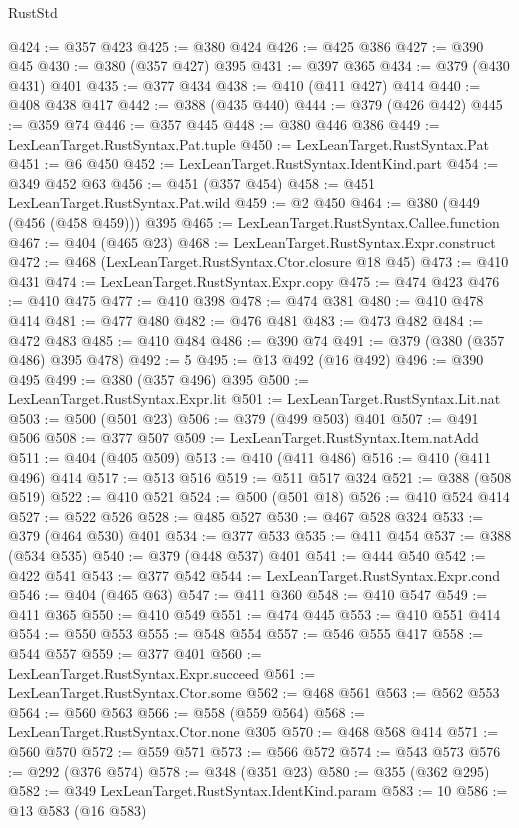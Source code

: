 \begin{lexlean}{RustStd}
\begin{coremodule}
{\begin{coremodule}
{{{{{{{{@424 := @357 @423
@425 := @380 @424
@426 := @425 @386
@427 := @390 @45
@430 := @380 (@357 @427) @395
@431 := @397 @365
@434 := @379 (@430 @431) @401
@435 := @377 @434
@438 := @410 (@411 @427) @414
@440 := @408 @438 @417
@442 := @388 (@435 @440)
@444 := @379 (@426 @442)
@445 := @359 @74
@446 := @357 @445
@448 := @380 @446 @386
@449 := LexLeanTarget.RustSyntax.Pat.tuple
@450 := LexLeanTarget.RustSyntax.Pat
@451 := @6 @450
@452 := LexLeanTarget.RustSyntax.IdentKind.part
@454 := @349 @452 @63
@456 := @451 (@357 @454)
@458 := @451 LexLeanTarget.RustSyntax.Pat.wild
@459 := @2 @450
@464 := @380 (@449 (@456 (@458 @459))) @395
@465 := LexLeanTarget.RustSyntax.Callee.function
@467 := @404 (@465 @23)
@468 := LexLeanTarget.RustSyntax.Expr.construct
@472 := @468 (LexLeanTarget.RustSyntax.Ctor.closure @18 @45)
@473 := @410 @431
@474 := LexLeanTarget.RustSyntax.Expr.copy
@475 := @474 @423
@476 := @410 @475
@477 := @410 @398
@478 := @474 @381
@480 := @410 @478 @414
@481 := @477 @480
@482 := @476 @481
@483 := @473 @482
@484 := @472 @483
@485 := @410 @484
@486 := @390 @74
@491 := @379 (@380 (@357 @486) @395 @478)
@492 := 5
@495 := @13 @492 (@16 @492)
@496 := @390 @495
@499 := @380 (@357 @496) @395
@500 := LexLeanTarget.RustSyntax.Expr.lit
@501 := LexLeanTarget.RustSyntax.Lit.nat
@503 := @500 (@501 @23)
@506 := @379 (@499 @503) @401
@507 := @491 @506
@508 := @377 @507
@509 := LexLeanTarget.RustSyntax.Item.natAdd
@511 := @404 (@405 @509)
@513 := @410 (@411 @486)
@516 := @410 (@411 @496) @414
@517 := @513 @516
@519 := @511 @517 @324
@521 := @388 (@508 @519)
@522 := @410 @521
@524 := @500 (@501 @18)
@526 := @410 @524 @414
@527 := @522 @526
@528 := @485 @527
@530 := @467 @528 @324
@533 := @379 (@464 @530) @401
@534 := @377 @533
@535 := @411 @454
@537 := @388 (@534 @535)
@540 := @379 (@448 @537) @401
@541 := @444 @540
@542 := @422 @541
@543 := @377 @542
@544 := LexLeanTarget.RustSyntax.Expr.cond
@546 := @404 (@465 @63)
@547 := @411 @360
@548 := @410 @547
@549 := @411 @365
@550 := @410 @549
@551 := @474 @445
@553 := @410 @551 @414
@554 := @550 @553
@555 := @548 @554
@557 := @546 @555 @417
@558 := @544 @557
@559 := @377 @401
@560 := LexLeanTarget.RustSyntax.Expr.succeed
@561 := LexLeanTarget.RustSyntax.Ctor.some
@562 := @468 @561
@563 := @562 @553
@564 := @560 @563
@566 := @558 (@559 @564)
@568 := LexLeanTarget.RustSyntax.Ctor.none @305
@570 := @468 @568 @414
@571 := @560 @570
@572 := @559 @571
@573 := @566 @572
@574 := @543 @573
@576 := @292 (@376 @574)
@578 := @348 (@351 @23)
@580 := @355 (@362 @295)
@582 := @349 LexLeanTarget.RustSyntax.IdentKind.param
@583 := 10
@586 := @13 @583 (@16 @583)
}}}}}}}}
\end{coremodule}}
\end{coremodule}
\end{lexlean}
